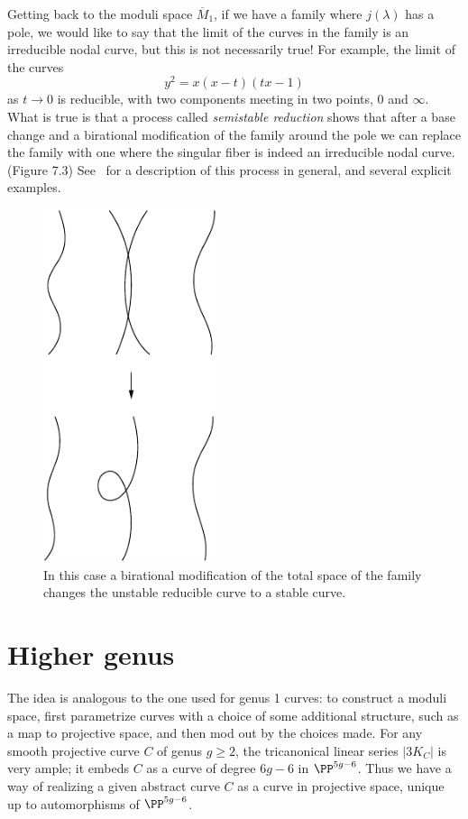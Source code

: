 Getting back to the moduli space $\overline M_1$, if we have a family where
$j(\lambda)$ has a pole, we would like to say that the limit of the curves in the family is an irreducible nodal curve,
but this is not necessarily true! For example, the limit of the curves
$$
y^2 = x(x-t)(tx-1)
$$
as $t \to 0$ is reducible, with two components meeting in two points, 0 and $\infty$.
What is true is that a process called \emph{semistable reduction} shows that after a base change and a birational
modification of the family around the pole we can replace the family with one where the singular fiber
is indeed an irreducible nodal curve. (Figure 7.3) See~\cite{MR1631825} for a description of this process in general, and several explicit examples.

\begin{figure}
\inprogress
\centerline{\includegraphics[width=2in]{"main/Fig07-1"}}
\caption{In this case a birational modification of the total space of the family changes the unstable reducible curve to a stable curve.}
\end{figure}

\section{Higher genus}

The  idea  is  analogous to the one used  for genus 1 curves: to construct a moduli space, first parametrize curves with a choice of some additional structure, such as a map to projective space, and then mod out by the choices made. For any smooth projective curve $C$ of genus $g\geq 2$, the tricanonical linear series $|3K_C|$ is very ample; it embeds $C$ as a curve of degree $6g-6$ in $\PP^{5g-6}$. Thus we have a way of realizing a given abstract curve $C$ as a curve in projective space, unique up to automorphisms of $\PP^{5g-6}$.

